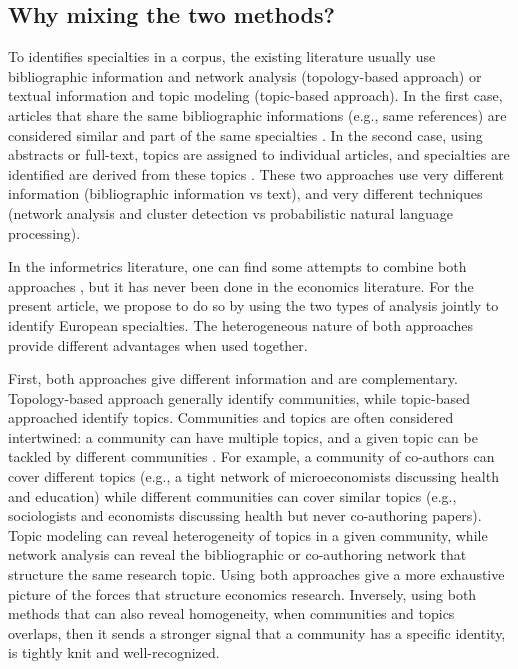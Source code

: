 \documentclass[]{elsarticle} %
\begin{document}
\hypertarget{why-mixing-the-two-methods}{%
\subsection{Why mixing the two
methods?}\label{why-mixing-the-two-methods}}

To identifies specialties in a corpus, the existing literature usually
use bibliographic information and network analysis (topology-based
approach) or textual information and topic modeling (topic-based
approach). In the first case, articles that share the same bibliographic
informations (e.g., same references) are considered similar and part of
the same specialties \citep{claveau2016}. In the second case, using
abstracts or full-text, topics are assigned to individual articles, and
specialties are identified are derived from these topics
\citep{ambrosino2018}. These two approaches use very different
information (bibliographic information vs text), and very different
techniques (network analysis and cluster detection vs probabilistic
natural language processing).

In the informetrics literature, one can find some attempts to combine
both approaches \citep{ding2011, li2012, yan2012, mao2017}, but it has
never been done in the economics literature. For the present article, we
propose to do so by using the two types of analysis jointly to identify
European specialties. The heterogeneous nature of both approaches
provide different advantages when used together.

First, both approaches give different information and are complementary.
Topology-based approach generally identify communities, while
topic-based approached identify topics. Communities and topics are often
considered intertwined: a community can have multiple topics, and a
given topic can be tackled by different communities
\citep{ding2011, yan2012}. For example, a community of co-authors can
cover different topics (e.g., a tight network of microeconomists
discussing health and education) while different communities can cover
similar topics (e.g., sociologists and economists discussing health but
never co-authoring papers). Topic modeling can reveal heterogeneity of
topics in a given community, while network analysis can reveal the
bibliographic or co-authoring network that structure the same research
topic. Using both approaches give a more exhaustive picture of the
forces that structure economics research. Inversely, using both methods
that can also reveal homogeneity, when communities and topics overlaps,
then it sends a stronger signal that a community has a specific
identity, is tightly knit and well-recognized.
\end{document}
